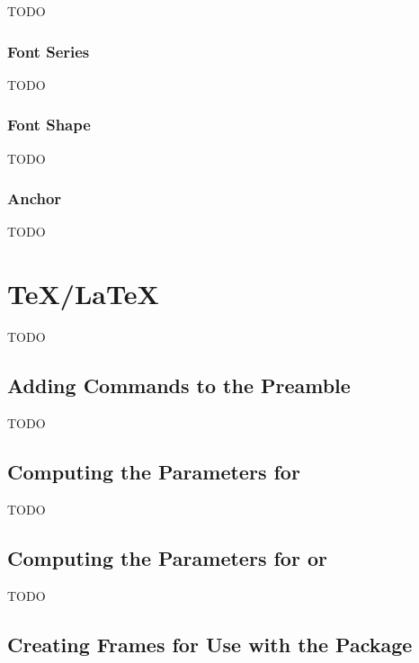 
TODO


\subsection{Font Series}\label{sec:fontseries}


TODO


\subsection{Font Shape}\label{sec:fontshape}


TODO


\subsection{Anchor}\label{sec:fontanchor}


TODO


\chapter{\TeX/\LaTeX}\label{sec:tex}

TODO


\section{Adding Commands to the Preamble}\label{sec:preamble}

TODO


\section{Computing the Parameters for }\label{sec:parshape}

TODO


\section{Computing the Parameters for  or
}
\label{sec:shapepar}

TODO


\section{Creating Frames for Use with the  Package}
\label{sec:flowframe}

